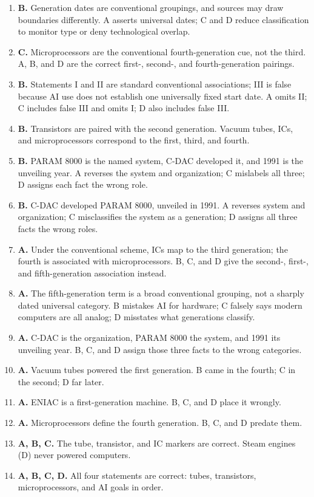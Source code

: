 \documentclass[11pt]{article}
\begin{document}
\begin{enumerate}[label=\textbf{Q\arabic*.}, leftmargin=*]
  organization identified for this system.
\item \textbf{B.} Generation dates are conventional groupings, and sources
  may draw boundaries differently. A asserts universal dates; C and D
  reduce classification to monitor type or deny technological overlap.
\item \textbf{C.} Microprocessors are the conventional fourth-generation
  cue, not the third. A, B, and D are the correct first-, second-, and
  fourth-generation pairings.
\item \textbf{B.} Statements I and II are standard conventional
  associations; III is false because AI use does not establish one
  universally fixed start date. A omits II; C includes false III and omits
  I; D also includes false III.
\item \textbf{B.} Transistors are paired with the second generation. Vacuum
  tubes, ICs, and microprocessors correspond to the first, third, and fourth.
\item \textbf{B.} PARAM 8000 is the named system, C-DAC developed it, and
  1991 is the unveiling year. A reverses the system and organization; C
  mislabels all three; D assigns each fact the wrong role.
\item \textbf{B.} C-DAC developed PARAM 8000, unveiled in 1991. A reverses
  system and organization; C misclassifies the system as a generation; D
  assigns all three facts the wrong roles.
\item \textbf{A.} Under the conventional scheme, ICs map to the third
  generation; the fourth is associated with microprocessors. B, C, and D
  give the second-, first-, and fifth-generation association instead.
\item \textbf{A.} The fifth-generation term is a broad conventional grouping,
  not a sharply dated universal category. B mistakes AI for hardware; C
  falsely says modern computers are all analog; D misstates what
  generations classify.
\item \textbf{A.} C-DAC is the organization, PARAM 8000 the system, and
  1991 its unveiling year. B, C, and D assign those three facts to the wrong
  categories.

\item \textbf{A.} Vacuum tubes powered the first generation. B came in the fourth; C in the second; D far later.
\item \textbf{A.} ENIAC is a first-generation machine. B, C, and D place it wrongly.
\item \textbf{A.} Microprocessors define the fourth generation. B, C, and D predate them.
\item \textbf{A, B, C.} The tube, transistor, and IC markers are correct. Steam engines (D) never powered computers.
\item \textbf{A, B, C, D.} All four statements are correct: tubes, transistors, microprocessors, and AI goals in order.
\end{enumerate}
\def\JKSSBLessonID{49}\def\JKSSBAnswers{1}
\end{document}
